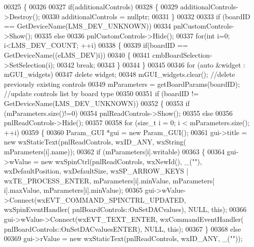 \begin{DoxyCode}
{{{00325 \{
00326 
00327     \textcolor{keywordflow}{if}(additionalControls)
00328     \{
00329         additionalControls->Destroy();
00330         additionalControls = \textcolor{keyword}{nullptr};
00331     \}
00332 
00333     \textcolor{keywordflow}{if} (boardID == GetDeviceName(LMS_DEV_UNKNOWN))
00334         pnlCustomControls->Show();
00335     \textcolor{keywordflow}{else}
00336         pnlCustomControls->Hide();
00337     \textcolor{keywordflow}{for}(\textcolor{keywordtype}{int} i=0; i<LMS_DEV_COUNT; ++i)
00338     \{
00339         \textcolor{keywordflow}{if}(boardID == GetDeviceName((eLMS_DEV)i))
00340         \{
00341             cmbBoardSelection->SetSelection(i);
00342             \textcolor{keywordflow}{break};
00343         \}
00344     \}
00345 
00346     \textcolor{keywordflow}{for} (\textcolor{keyword}{auto} &widget : mGUI_widgets)
00347         \textcolor{keyword}{delete} widget;
00348     mGUI\_widgets.clear(); \textcolor{comment}{//delete previously existing controls}
00349     mParameters = getBoardParams(boardID); \textcolor{comment}{//update controls list by board type}
00350 
00351     \textcolor{keywordflow}{if} (boardID != GetDeviceName(LMS_DEV_UNKNOWN))
00352     \{
00353         \textcolor{keywordflow}{if} (mParameters.size()!=0)
00354             pnlReadControls->Show();
00355         \textcolor{keywordflow}{else}
00356             pnlReadControls->Hide();
00357 
00358         \textcolor{keywordflow}{for} (\textcolor{keywordtype}{size\_t} i = 0; i < mParameters.size(); ++i)
00359         \{
00360             Param_GUI *gui = \textcolor{keyword}{new} Param_GUI();
00361             gui->title = \textcolor{keyword}{new} wxStaticText(pnlReadControls, wxID\_ANY, wxString(
      mParameters[i].name));
00362             \textcolor{keywordflow}{if} (mParameters[i].writable)
00363             \{
00364                 gui->wValue = \textcolor{keyword}{new} wxSpinCtrl(pnlReadControls, wxNewId(), \_(\textcolor{stringliteral}{""}), wxDefaultPosition, 
      wxDefaultSize, wxSP\_ARROW\_KEYS | wxTE\_PROCESS\_ENTER, mParameters[i].minValue, mParameters[
      i].maxValue, mParameters[i].minValue);
00365                 gui->wValue->Connect(wxEVT\_COMMAND\_SPINCTRL\_UPDATED, wxSpinEventHandler(
      pnlBoardControls::OnSetDACvalues), NULL, \textcolor{keyword}{this});
00366                 gui->wValue->Connect(wxEVT\_TEXT\_ENTER, wxCommandEventHandler(
      pnlBoardControls::OnSetDACvaluesENTER), NULL, \textcolor{keyword}{this});
00367             \}
00368             \textcolor{keywordflow}{else}
00369                 gui->rValue = \textcolor{keyword}{new} wxStaticText(pnlReadControls, wxID\_ANY, \_(\textcolor{stringliteral}{""}));
}}}
\end{DoxyCode}
